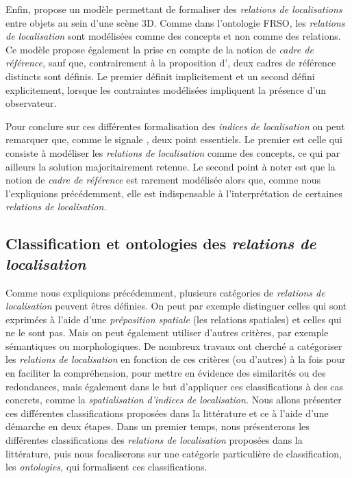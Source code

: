 Enfin, \textcite{Trinh2012} propose un modèle permettant de formaliser
des \emph{relations de localisations} entre objets au sein d'une scène
3D. Comme dans l'ontologie FRSO, les \emph{relations de localisation}
sont modélisées comme des concepts et non comme des relations. Ce
modèle propose également la prise en compte de la notion de
\emph{cadre de référence,} sauf que, contrairement à la proposition
d'\textcite{Hudelot2008a}, deux cadres de référence distincts sont
définis. Le premier définit implicitement et un second défini
explicitement, lorsque les contraintes modélisées impliquent la
présence d'un observateur.

Pour conclure sur ces différentes formalisation des \emph{indices de
  localisation} on peut remarquer que, comme le signale
\textcite{Duchene2019}, deux point essentiels. Le premier est celle
qui consiste à modéliser les \emph{relations de localisation} comme
des concepts, ce qui par ailleurs la solution majoritairement
retenue. Le second point à noter est que la notion de \emph{cadre de
  référence} est rarement modélisée alors que, comme nous
l'expliquions précédemment, elle est indispensable à l'interprétation
de certaines \emph{relations de localisation.}

\subsection{Classification et ontologies des \emph{relations de
    localisation}}

Comme nous expliquions précédemment, plusieurs catégories de
\emph{relations de localisation} peuvent êtres définies. On peut par
exemple distinguer celles qui sont exprimées à l'aide d'une
\emph{préposition spatiale} (\ie les relations spatiales) et celles
qui ne le sont pas. Mais on peut également utiliser d'autres critères,
par exemple sémantiques ou morphologiques. De nombreux travaux ont
cherché a catégoriser les \emph{relations de localisation} en fonction
de ces critères (ou d'autres) à la fois pour en faciliter la
compréhension, pour mettre en évidence des similarités ou des
redondances, mais également dans le but d'appliquer ces
classifications à des cas concrets, comme la \emph{spatialisation
  d'indices de localisation.} Nous allons présenter ces différentes
classifications proposées dans la littérature et ce à l'aide d'une
démarche en deux étapes. Dans un premier temps, nous présenterons les
différentes classifications des \emph{relations de localisation}
proposées dans la littérature, puis nous focaliserons sur une
catégorie particulière de classification, les \emph{ontologies,} qui
formalisent ces classifications.

